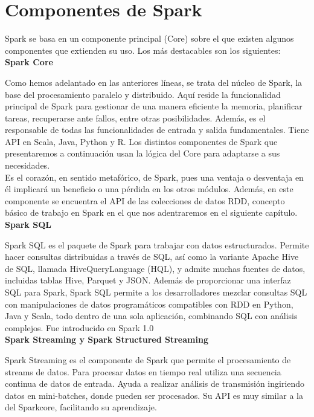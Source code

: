 \chapter{Componentes de Spark}

Spark se basa en un componente principal (Core) sobre el que existen algunos componentes que extienden su uso. Los más destacables son los siguientes:\\

\textbf{Spark Core}

Como hemos adelantado en las anteriores líneas, se trata del núcleo de Spark, la base del procesamiento paralelo y distribuido. Aquí reside la funcionalidad principal de Spark para gestionar de una manera eficiente la memoria, planificar tareas, recuperarse ante fallos, entre otras posibilidades. Además, es el responsable de todas las funcionalidades de entrada y salida fundamentales. Tiene API en Scala, Java, Python y R. Los distintos componentes de Spark que presentaremos a continuación usan la lógica del Core para adaptarse a sus necesidades.\\

Es el corazón, en sentido metafórico, de Spark, pues una ventaja o desventaja en él implicará un beneficio o una pérdida en los otros módulos.  Además, en este componente se encuentra el API de las colecciones de datos RDD, concepto básico de trabajo en Spark en el que nos adentraremos en el siguiente capítulo.\\

\textbf{Spark SQL}

Spark SQL es el paquete de Spark para trabajar con datos estructurados. Permite hacer consultas distribuidas a través de SQL, así como la variante Apache Hive de SQL, llamada HiveQueryLanguage (HQL), y admite muchas fuentes de datos, incluidas tablas Hive, Parquet y JSON. Además de proporcionar una interfaz SQL para Spark, Spark SQL permite a los desarrolladores mezclar consultas SQL con manipulaciones de datos programáticos compatibles con RDD en Python, Java y Scala, todo dentro de una sola aplicación, combinando SQL con análisis complejos. Fue introducido en Spark 1.0\\

\textbf{Spark Streaming y Spark Structured Streaming}

Spark Streaming es el componente de Spark que permite el procesamiento de streams de datos. Para procesar datos en tiempo real utiliza una secuencia continua de datos de entrada. Ayuda a realizar análisis de transmisión ingiriendo datos en mini-batches, donde pueden ser procesados. Su API es muy similar a la del Sparkcore, facilitando su aprendizaje.\\

